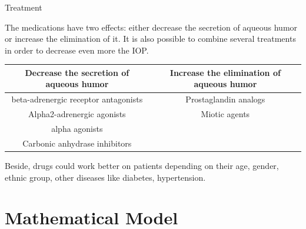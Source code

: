 \documentclass[9pt]{beamer}
\begin{document}
\begin{frame}{Treatment}

The medications have two effects: either decrease the secretion of aqueous humor or increase the elimination of it. It is also possible to combine several treatments in order to decrease even more the IOP.
\newline
\\
\begin{tabular}{|c|c|}
\hline
Decrease the secretion of aqueous humor & Increase the elimination of aqueous humor\\
\hline
beta-adrenergic receptor antagonists & Prostaglandin analogs \\
Alpha2-adrenergic agonists & Miotic agents \\
alpha agonists &  \\
Carbonic anhydrase inhibitors &  \\
\hline
\end{tabular}
\newline
\newline
Beside, drugs could work better on patients depending on their age, gender, ethnic group, other diseases like diabetes, hypertension. 

\end{frame}

\section{Mathematical Model}
\end{document}

